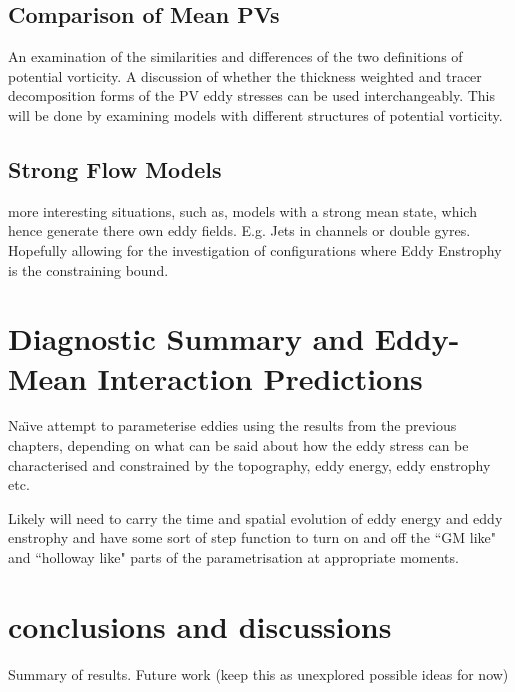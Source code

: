 \documentclass[10pt,a4paper]{article}
\begin{document}
\subsection{Comparison of Mean PVs}

An examination of the similarities and differences
of the two definitions of potential vorticity. 
A discussion of whether the thickness
weighted and tracer decomposition forms of the
PV eddy stresses can be used interchangeably.
This will be done by examining models with
different structures of potential vorticity.

\subsection{Strong Flow Models}

more interesting situations, such as, models
with a strong mean state, which hence
generate there own eddy fields. E.g. Jets in
channels or double gyres. Hopefully allowing 
for the investigation of configurations where 
Eddy Enstrophy is the constraining bound.


\section{Diagnostic Summary and Eddy-Mean Interaction Predictions}

Na\"{\i}ve attempt to parameterise eddies using the 
results from the previous chapters, depending
on what can be said about how the eddy stress can
be characterised and constrained by the topography,
eddy energy, eddy enstrophy etc. 

Likely will need to carry the time and spatial
evolution of eddy energy and eddy enstrophy and have
some sort of step function to turn on and off the
``GM like" and ``holloway like" parts of the parametrisation at appropriate moments.


\section{conclusions and discussions}

Summary of results.
Future work (keep this as unexplored possible ideas for now)

	 \printbibliography
\end{document}
